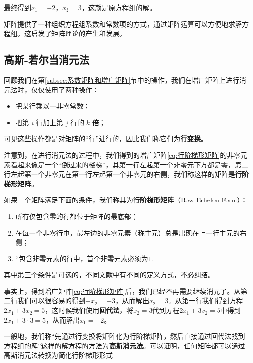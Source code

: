 最终得到$x_1=-2$，$x_2=3$，这就是原方程组的解。

矩阵提供了一种组织方程组系数和常数项的方式，通过矩阵运算可以方便地求解方程组。这启发了矩阵理论的产生和发展。


\subsection{高斯-若尔当消元法}
\label{subsec:高斯-若尔当消元法}

回顾我们在第\ref{subsec:系数矩阵和增广矩阵}节中的操作，我们在增广矩阵上进行消元法时，仅仅使用了两种操作：
\begin{itemize}
    \item 把某行乘以一非零常数；
    \item 把第 $i$ 行加上第 $j$ 行的 $k$ 倍；
\end{itemize}

可见这些操作都是对矩阵的“行”进行的，因此我们称它们为\textcolor{third}{\bf 行变换}。

注意到，在进行消元法的过程中，我们得到的增广矩阵\ref{eq:行阶梯形矩阵}的非零元素看起来像是一个“倒过来的楼梯”，其第一行左起第一个非零元下方都是零，第二行左起第一个非零元在第一行左起第一个非零元的右侧，我们称这样的矩阵是\textcolor{third}{\bf 行阶梯形矩阵}。

\begin{definition}[行阶梯形矩阵]
    如果一个矩阵满足下面的条件，我们称其为{\bf 行阶梯形矩阵}（Row Echelon Form）：
    \begin{enumerate}
        \item 所有仅包含零的行都位于矩阵的最底部；
        \item 在每一个非零行中，最左边的非零元素（称主元）总是出现在上一行主元的右侧；
        \item *包含非零元素的行中，首个非零元素必须为$1$.
    \end{enumerate}
    其中第三个条件是可选的，不同文献中有不同的定义方式，不必纠结。
\end{definition}

事实上，得到增广矩阵\ref{eq:行阶梯形矩阵}后，我们已经不再需要继续消元了。从第二行我们可以很容易的得到$-x_2=-3$，从而解出$x_2=3$。从第一行我们得到方程$2x_1+3x_2=5$，这时候我们使用\textbf{回代法}，将$x_2=3$代到方程$2x_1+3x_2=5$中得到$2x_1+3\cdot 3=5$，从而解出$x_1=-2$。

一般地，我们称\textcolor{second}{“先通过行变换将矩阵化为行阶梯矩阵，然后直接通过回代法找到方程组的解”}这样的解方程的方法为\textcolor{third}{\bf 高斯消元法}。可以证明，任何矩阵都可以通过高斯消元法转换为简化行阶梯形形式

